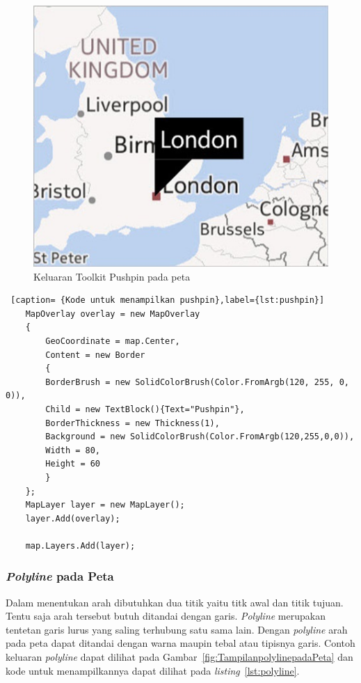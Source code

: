 \begin{figure}[h]
	\centering
		\includegraphics[scale=0.5]{Gambar/toolkit_pushpin}
	\caption{Keluaran Toolkit Pushpin pada peta \cite{Manning}}
	\label{fig:toolkit_pushpin}
\end{figure}

\begin{lstlisting} [caption= {Kode untuk menampilkan pushpin},label={lst:pushpin}]
	MapOverlay overlay = new MapOverlay
	{
		GeoCoordinate = map.Center,
		Content = new Border
		{
		BorderBrush = new SolidColorBrush(Color.FromArgb(120, 255, 0, 0)),
		Child = new TextBlock(){Text="Pushpin"},
		BorderThickness = new Thickness(1),
		Background = new SolidColorBrush(Color.FromArgb(120,255,0,0)),
		Width = 80,
		Height = 60
		}
	};
	MapLayer layer = new MapLayer();
	layer.Add(overlay);

	map.Layers.Add(layer);
\end{lstlisting}

\subsubsection{\textit{Polyline} pada Peta}
\label{subsubsec:Polyline pada Peta}
\hspace{0.5cm} Dalam menentukan arah dibutuhkan dua titik yaitu titk awal dan titik tujuan. Tentu saja arah tersebut butuh ditandai dengan garis. \textit{Polyline} merupakan tentetan garis lurus yang saling terhubung satu sama lain. Dengan \textit{polyline} arah pada peta dapat ditandai dengan warna maupin tebal atau tipisnya garis. Contoh keluaran \textit{polyline} dapat dilihat pada Gambar~\ref{fig:TampilanpolylinepadaPeta} dan kode untuk menampilkannya dapat dilihat pada \textit{listing}~\ref{lst:polyline}.

